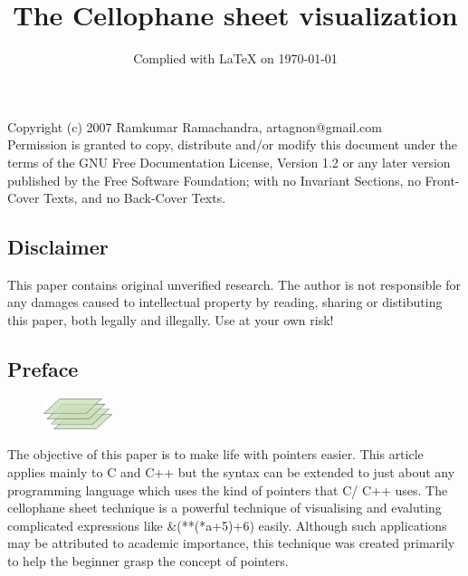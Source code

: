 \documentclass[10pt,twoside]{article}
\begin{document}
\title{The Cellophane sheet visualization}
\date{Complied with \LaTeX{} on \today}
\maketitle
\begin{center}
{\scriptsize Copyright (c) 2007 Ramkumar Ramachandra,
artagnon@gmail.com\\ Permission is granted to copy, distribute and/or
modify this document under the terms of the GNU Free Documentation
License, Version 1.2 or any later version published by the Free
Software Foundation; with no Invariant Sections, no Front-Cover Texts,
and no Back-Cover Texts.}
\end{center}

\subsection*{Disclaimer}
This paper contains original unverified research. The author is not responsible
for any damages caused to intellectual property by reading, sharing or
distibuting this paper, both legally and illegally. Use at your own risk!

\subsection*{Preface}

\begin{figure}
\includegraphics[width=20mm]{res/logo.pdf}
\end{figure}

The objective of this paper is to make life with pointers easier. This article
applies mainly to C and C++ but the syntax can be extended to just about any
programming language which uses the kind of pointers that C/ C++ uses. The
cellophane sheet technique is a powerful technique of visualising and evaluting
complicated expressions like \&(**(*a+5)+6) easily. Although such applications
may be attributed to academic importance, this technique was created primarily
to help the beginner grasp the concept of pointers.
\end{document}
